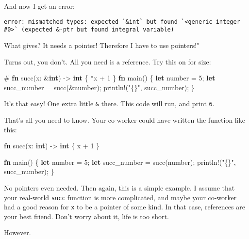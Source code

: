 \documentclass[]{article}
\newenvironment{Shaded}{}{}
\newcommand{\KeywordTok}[1]{\textcolor[rgb]{0.00,0.44,0.13}{\textbf{{#1}}}}
\newcommand{\DecValTok}[1]{\textcolor[rgb]{0.25,0.63,0.44}{{#1}}}
\newcommand{\StringTok}[1]{\textcolor[rgb]{0.25,0.44,0.63}{{#1}}}
\newcommand{\OtherTok}[1]{\textcolor[rgb]{0.00,0.44,0.13}{{#1}}}
\newcommand{\NormalTok}[1]{{#1}}
\begin{document}
And now I get an error:

\begin{verbatim}
error: mismatched types: expected `&int` but found `<generic integer #0>` (expected &-ptr but found integral variable)
\end{verbatim}

What gives? It needs a pointer! Therefore I have to use pointers!"

Turns out, you don't. All you need is a reference. Try this on for size:

\begin{Shaded}
\begin{Highlighting}[]
\NormalTok{# }\KeywordTok{fn} \NormalTok{succ(x: &}\KeywordTok{int}\NormalTok{) -> }\KeywordTok{int} \NormalTok{\{ *x + }\DecValTok{1} \NormalTok{\}}
\KeywordTok{fn} \NormalTok{main() \{}
    \KeywordTok{let} \NormalTok{number = }\DecValTok{5}\NormalTok{;}
    \KeywordTok{let} \NormalTok{succ_number = succ(&number);}
    \OtherTok{println!}\NormalTok{(}\StringTok{"\{\}"}\NormalTok{, succ_number);}
\NormalTok{\}}
\end{Highlighting}
\end{Shaded}

It's that easy! One extra little \texttt{\&} there. This code will run,
and print \texttt{6}.

That's all you need to know. Your co-worker could have written the
function like this:

\begin{Shaded}
\begin{Highlighting}[]
\KeywordTok{fn} \NormalTok{succ(x: }\KeywordTok{int}\NormalTok{) -> }\KeywordTok{int} \NormalTok{\{ x + }\DecValTok{1} \NormalTok{\}}

\KeywordTok{fn} \NormalTok{main() \{}
    \KeywordTok{let} \NormalTok{number = }\DecValTok{5}\NormalTok{;}
    \KeywordTok{let} \NormalTok{succ_number = succ(number);}
    \OtherTok{println!}\NormalTok{(}\StringTok{"\{\}"}\NormalTok{, succ_number);}
\NormalTok{\}}
\end{Highlighting}
\end{Shaded}

No pointers even needed. Then again, this is a simple example. I assume
that your real-world \texttt{succ} function is more complicated, and
maybe your co-worker had a good reason for \texttt{x} to be a pointer of
some kind. In that case, references are your best friend. Don't worry
about it, life is too short.

However.
\end{document}
